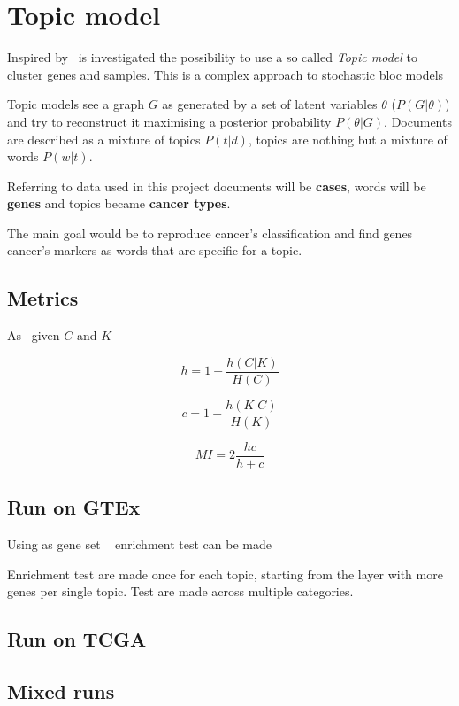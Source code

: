 \chapter{Topic model}\label{ch:topicmodelling}
Inspired by~\cite{gerlach2018network} is investigated the possibility to use a so called \textit{Topic model} to cluster genes and samples.
This is a complex approach to stochastic bloc models~\cite{Holland1983}

Topic models see a graph $G$ as generated by a set of latent
variables $\theta$ ($P(G|\theta)$) and try to reconstruct it maximising a posterior probability $P(\theta|G)$.
Documents are described as a mixture of topics $P(t|d)$, topics are nothing but
a mixture of words $P(w|t)$.

Referring to data used in this project documents will be \textbf{cases}, words will be \textbf{genes} and topics became
\textbf{cancer types}.

The main goal would be to reproduce cancer's classification and find genes
cancer's markers as words that are specific for a topic.

\section{Metrics}
As~\cite{rosenberg2007v} given $C$ and $K$

\begin{equation}\label{eq:homogeneity}
    h=1-\frac{h(C|K)}{H(C)}
\end{equation}

\begin{equation}\label{eq:completness}
    c=1-\frac{h(K|C)}{H(K)}
\end{equation}

\begin{equation}\label{eq:mutualinformation}
    MI=2\frac{h c}{h + c}
\end{equation}

\section{Run on GTEx}

Using as gene set ~\cite{Ardlie2015} enrichment test can be made \cite{Kuleshov2016}

Enrichment test are made once for each topic, starting from the layer with more genes per 
single topic. Test are made across multiple categories.

\section{Run on TCGA}

\section{Mixed runs}

